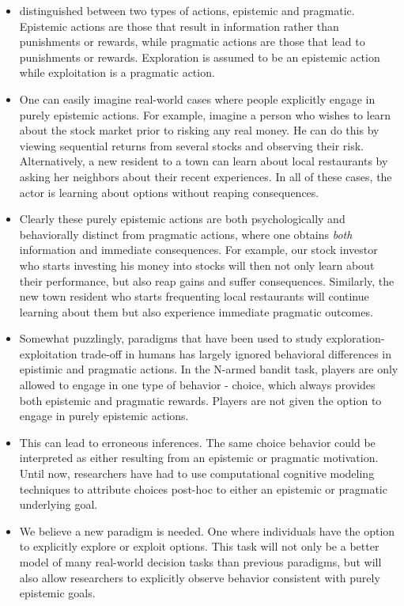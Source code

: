\documentclass[a4paper,doc,natbib,floatsintext]{apa6}\usepackage[]{graphicx}\usepackage[]{color}
\begin{document}
\begin{itemize}

  \item \cite{neth2008thinking} distinguished between two types of actions, epistemic and pragmatic. Epistemic actions are those that result in information rather than punishments or rewards, while pragmatic actions are those that lead to punishments or rewards. Exploration is assumed to be an epistemic action while exploitation is a pragmatic action.
  
  \item One can easily imagine real-world cases where people explicitly engage in purely epistemic actions. For example, imagine a person who wishes to learn about the stock market prior to risking any real money. He can do this by viewing sequential returns from several stocks and observing their risk. Alternatively, a new resident to a town can learn about local restaurants by asking her neighbors about their recent experiences. In all of these cases, the actor is learning about options without reaping consequences.
  
  \item Clearly these purely epistemic actions are both psychologically and behaviorally distinct from pragmatic actions, where one obtains \textit{both} information and immediate consequences. For example, our stock investor who starts investing his money into stocks will then not only learn about their performance, but also reap gains and suffer consequences. Similarly, the new town resident who starts frequenting local restaurants will continue learning about them but also experience immediate pragmatic outcomes.
  
  \item Somewhat puzzlingly, paradigms that have been used to study exploration-exploitation trade-off in humans has largely ignored behavioral differences in epistimic and pragmatic actions. In the N-armed bandit task, players are only allowed to engage in one type of behavior - choice, which always provides both epistemic and pragmatic rewards. Players are not given the option to engage in purely epistemic actions. 
  
  \item This can lead to erroneous inferences. The same choice behavior could be interpreted as either resulting from an epistemic or pragmatic motivation. Until now, researchers have had to use computational cognitive modeling techniques to attribute choices post-hoc to either an epistemic or pragmatic underlying goal.
  
  \item We believe a new paradigm is needed. One where individuals have the option to explicitly explore or exploit options. This task will not only be a better model of many real-world decision tasks than previous paradigms, but will also allow researchers to explicitly observe behavior consistent with purely epistemic goals.

\end{itemize}
\end{document}
